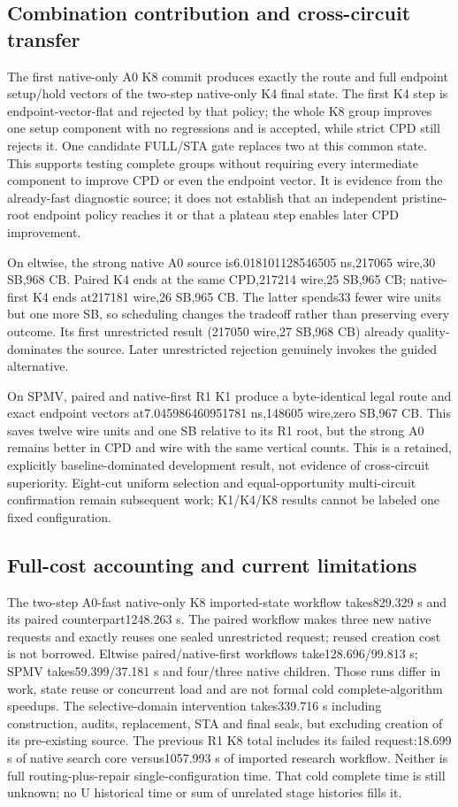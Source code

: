 \subsection{Combination contribution and cross-circuit transfer}
The first native-only A0 K8 commit produces exactly the route and full endpoint setup/hold vectors of the two-step native-only K4 final state. The first K4 step is endpoint-vector-flat and rejected by that policy; the whole K8 group improves one setup component with no regressions and is accepted, while strict CPD still rejects it. One candidate FULL/STA gate replaces two at this common state. This supports testing complete groups without requiring every intermediate component to improve CPD or even the endpoint vector. It is evidence from the already-fast diagnostic source; it does not establish that an independent pristine-root endpoint policy reaches it or that a plateau step enables later CPD improvement.

On eltwise, the strong native A0 source is6.018101128546505 ns,217065 wire,30 SB,968 CB. Paired K4 ends at the same CPD,217214 wire,25 SB,965 CB; native-first K4 ends at217181 wire,26 SB,965 CB. The latter spends33 fewer wire units but one more SB, so scheduling changes the tradeoff rather than preserving every outcome. Its first unrestricted result (217050 wire,27 SB,968 CB) already quality-dominates the source. Later unrestricted rejection genuinely invokes the guided alternative.

On SPMV, paired and native-first R1 K1 produce a byte-identical legal route and exact endpoint vectors at7.045986460951781 ns,148605 wire,zero SB,967 CB. This saves twelve wire units and one SB relative to its R1 root, but the strong A0 remains better in CPD and wire with the same vertical counts. This is a retained, explicitly baseline-dominated development result, not evidence of cross-circuit superiority. Eight-cut uniform selection and equal-opportunity multi-circuit confirmation remain subsequent work; K1/K4/K8 results cannot be labeled one fixed configuration.

\subsection{Full-cost accounting and current limitations}
The two-step A0-fast native-only K8 imported-state workflow takes829.329 s and its paired counterpart1248.263 s. The paired workflow makes three new native requests and exactly reuses one sealed unrestricted request; reused creation cost is not borrowed. Eltwise paired/native-first workflows take128.696/99.813 s; SPMV takes59.399/37.181 s and four/three native children. Those runs differ in work, state reuse or concurrent load and are not formal cold complete-algorithm speedups. The selective-domain intervention takes339.716 s including construction, audits, replacement, STA and final seals, but excluding creation of its pre-existing source. The previous R1 K8 total includes its failed request:18.699 s of native search core versus1057.993 s of imported research workflow. Neither is full routing-plus-repair single-configuration time. That cold complete time is still unknown; no U historical time or sum of unrelated stage histories fills it.

